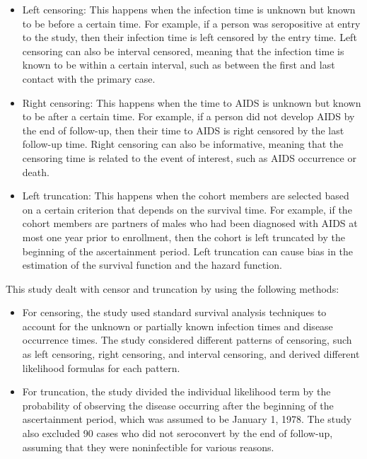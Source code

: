 \documentclass[UTF8,a4paper,10pt]{article}
\begin{document}
\begin{itemize}
  \item Left censoring: This happens when the infection time is unknown but known to be before a certain time. For example, if a person was seropositive at entry to the study, then their infection time is left censored by the entry time. Left censoring can also be interval censored, meaning that the infection time is known to be within a certain interval, such as between the first and last contact with the primary case.
  \item Right censoring: This happens when the time to AIDS is unknown but known to be after a certain time. For example, if a person did not develop AIDS by the end of follow-up, then their time to AIDS is right censored by the last follow-up time. Right censoring can also be informative, meaning that the censoring time is related to the event of interest, such as AIDS occurrence or death.
  \item Left truncation: This happens when the cohort members are selected based on a certain criterion that depends on the survival time. For example, if the cohort members are partners of males who had been diagnosed with AIDS at most one year prior to enrollment, then the cohort is left truncated by the beginning of the ascertainment period. Left truncation can cause bias in the estimation of the survival function and the hazard function.


\end{itemize}


This study dealt with censor and truncation by using the following methods:

\begin{itemize}
  \item For censoring, the study used standard survival analysis techniques to account for the unknown or partially known infection times and disease occurrence times. The study considered different patterns of censoring, such as left censoring, right censoring, and interval censoring, and derived different likelihood formulas for each pattern.
  \item For truncation, the study divided the individual likelihood term by the probability of observing the disease occurring after the beginning of the ascertainment period, which was assumed to be January 1, 1978. The study also excluded 90 cases who did not seroconvert by the end of follow-up, assuming that they were noninfectible for various reasons.

\end{itemize}




\begin{equation*}
  \begin{aligned}
  \end{aligned}
\end{equation*}
\end{document}
